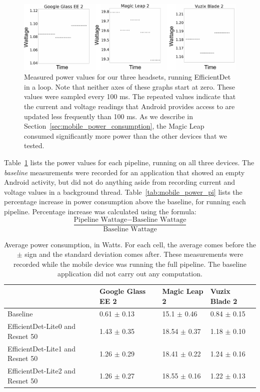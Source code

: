 \begin{figure}
  \includegraphics[width=\textwidth]{figures/power_graphs.pdf}
  \caption{Measured power values for our three headsets, running EfficientDet in
    a loop.
    Note that neither axes of these graphs start at zero.
    These values were sampled every 100 ms.
    The repeated values indicate that the current and voltage readings that
    Android provides access to are updated less frequently than 100 ms.
    As we describe in Section~\ref{sec:mobile_power_consumption}, the Magic Leap
    consumed significantly more power than the other devices that we tested.
  }\label{fig:power_graphs}
\end{figure}

Table~\ref{tab:mobile_power} lists the power values for each pipeline, running
on all three devices.
The \emph{baseline} measurements were recorded for an application that showed an
empty Android activity, but did not do anything aside from recording current and
voltage values in a background thread.
Table~\ref{tab:mobile_power_pi} lists the percentage increase in power
consumption above the baseline, for running each pipeline.
Percentage increase was calculated using the formula:
\[
  \frac{\text{Pipeline Wattage} - \text{Baseline Wattage}}{
    \text{Baseline Wattage}}
\]

\begin{table}
\begin{tabular}{|l||l|l|l|}
  \hline
  & Google Glass EE 2 & Magic Leap 2 & Vuzix Blade 2\\
  \hline
  \hline
  Baseline & 0.61 $\pm$ 0.13 & 15.1 $\pm$ 0.46 & 0.84 $\pm$ 0.15\\
  EfficientDet-Lite0 and Resnet 50 & 1.43 $\pm$ 0.35 & 18.54 $\pm$ 0.37 & 1.18 $\pm$ 0.10\\
  EfficientDet-Lite1 and Resnet 50 & 1.26 $\pm$ 0.29 & 18.41 $\pm$ 0.22 & 1.24 $\pm$ 0.16\\
  EfficientDet-Lite2 and Resnet 50 & 1.26 $\pm$ 0.27 & 18.55 $\pm$ 0.16 & 1.22 $\pm$ 0.13\\
  \hline
\end{tabular}
  \caption{
    Average power consumption, in Watts.
    For each cell, the average comes before the $\pm$ sign and the standard
    deviation comes after.
    These measurements were recorded while the mobile device was running the
    full pipeline.
    The baseline application did not carry out any computation.
  }\label{tab:mobile_power}
\end{table}

